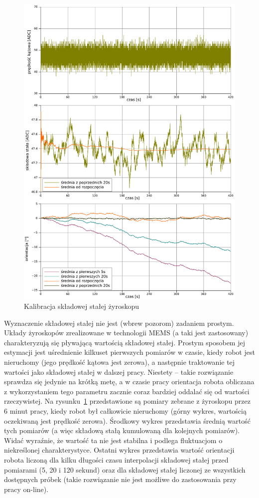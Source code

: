 \begin{figure}[htp!]
\centering
\includegraphics[width=15.5cm]{../../Common/pomiary/gyro_bias}
\caption{Kalibracja składowej stałej żyroskopu}
\label{fig:gyro_bias}
\end{figure}

Wyznaczenie składowej stałej nie jest (wbrew pozorom) zadaniem prostym. Układy
żyroskopów zrealizowane w technologii MEMS (a taki jest zastosowany)
charakteryzują się pływającą wartością składowej stałej. Prostym sposobem jej
estymacji jest uśrednienie kilkuset pierwszych pomiarów w czasie, kiedy
robot jest nieruchomy (jego prędkość kątowa jest zerowa), a następnie
traktowanie tej wartości jako składowej stałej w dalszej pracy. Niestety --
takie rozwiązanie sprawdza się jedynie na krótką metę, a w czasie pracy
orientacja robota obliczana z wykorzystaniem tego parametru zacznie coraz
bardziej oddalać się od wartości rzeczywistej. Na rysunku~\ref{fig:gyro_bias}
przedstawione są pomiary zebrane z żyroskopu przez 6 minut pracy, kiedy robot
był całkowicie nieruchomy (górny wykres, wartością oczekiwaną jest prędkość
zerowa). Środkowy wykres przedstawia średnią wartość tych pomiarów (a więc
składową stałą kumulowaną dla kolejnych pomiarów). Widać wyraźnie, że wartość ta
nie jest stabilna i podlega fluktuacjom o niekreślonej charakterystyce. Ostatni
wykres przedstawia wartość orientacji robota liczoną dla kilku długości czasu
interpolacji składowej stałej przed pomiarami (5, 20 i 120 sekund) oraz dla
składowej stałej liczonej ze wszystkich dostępnych próbek (takie rozwiązanie
nie jest możliwe do zastosowania przy pracy on-line). 

